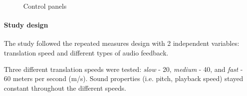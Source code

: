 \begin{figure}
	\centering

	
	\caption{Control panels}
	\label{fig:pilot1controlpanel}
\end{figure}

\paragraph{Study design}
The study followed the repeated measures design with 2 independent variables: translation speed and different types of audio feedback.

Three different translation speeds were tested: \textit{slow} - 20, \textit{medium }- 40, and \textit{fast }- 60 meters per second (m/s). Sound properties (i.e. pitch, playback speed) stayed constant throughout the different speeds.

